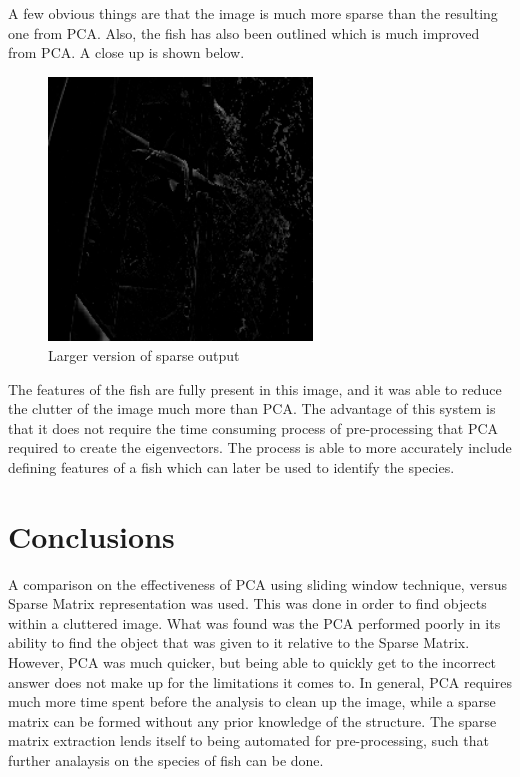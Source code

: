 \documentclass[11pt]{article} %
\begin{document}
A few obvious things are that the image is much more sparse than the resulting one from PCA. Also, the fish
has also been outlined which is much improved from PCA. A close up is shown below.
\begin{figure}[H]
\includegraphics[width=7cm]{Images/sprs2.png}
\caption{Larger version of sparse output}
\end{figure}
The features of the fish are fully present in this image, and it was able to reduce the clutter of the image much
more than PCA. The advantage of this system is that it does not require the time consuming process of pre-processing
that PCA required to create the eigenvectors. The process is able to more accurately include defining features
of a fish which can later be used to identify the species.

\section{Conclusions}
A comparison on the effectiveness of PCA using sliding window technique, versus Sparse Matrix representation was used.
This was done in order to find objects within a cluttered image. What was found was the PCA performed poorly in its ability to find
the object that was given to it relative to the Sparse Matrix. However, PCA was much quicker, but being able to quickly get to the
incorrect answer does not make up for the limitations it comes to. In general, PCA requires much more time spent before the analysis to
clean up the image, while a sparse matrix can be formed without any prior knowledge of the structure. The sparse matrix extraction
lends itself to being automated for pre-processing, such that further analaysis on the species of fish can be done.
\end{document}
